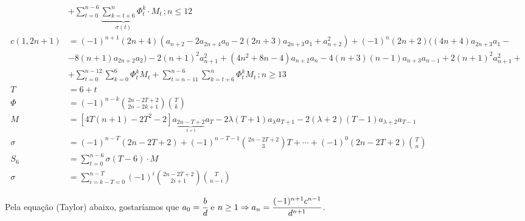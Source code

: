 \documentclass[10pt,a4paper]{article}
\begin{document}
\begin{align*}
    &+ \sum_{t = 0}^{n - 6} \underbrace{\sum_{k = t + 6}^n \Phi_t^k}_{\sigma(t)} \cdot M_t \,; n \le 12 \\
    c(1, 2n + 1) &= (-1)^{n + 1} (2n + 4) (a_{n+2} - 2 a_{2n+4} a_0 - 2 (2n + 3) a_{2n + 3} a_1 + a_{n+2}^2) + (-1)^n (2n + 2) ((4n + 4) a_{2n + 3} a_1 -\\
    &- 8(n+1) a_{2n + 2} a_2) - 2 (n + 1)^2 a_{n + 1}^2  + (4n^2 + 8n - 4) a_{n + 2} a_n - 4 (n + 3)(n - 1) a_{n + 3} a_{n - 1} + 2 (n + 1)^2 a_{n + 1}^2 + \\
    &+ \sum_{t = 0}^{n - 12}  \sum_{k = 0}^6 \Phi_t^k M_t +  \sum_{t = n - 11}^{n - 6}  \sum_{k = t + 6}^n \Phi_t^k M_t \,; n \ge 13 \\
    T &= 6 + t \\
    \Phi &= (-1)^{n - k} \binom{2n - 2T + 2}{2n - 2k + 1} \binom{T}{k} \\
    M &= [4T(n + 1) - 2T^2 - 2] a_{\underbrace{2n - T + 2}_{\lambda + 1}} a_T - 2\lambda (T + 1) a_\lambda a_{T + 1} - 2(\lambda + 2)(T - 1) a_{\lambda + 2} a_{T - 1} \\
    \sigma &= (-1)^{n - T} (2n - 2T + 2) + (-1)^{n - T - 1} \binom{2n - 2T + 2}{3} T + \cdots + (-1)^0 (2n - 2T + 2) \binom{T}{n} \\
    S_6 &= \sum_{t = 0}^{n - 6} \sigma(T - 6) \cdot M \\
    \sigma &= \sum_{i = k - T = 0}^{n - T} (-1)^i \binom{2n - 2T + 2}{2i + 1} \binom{T}{n - i}
  \end{align*}



		Pela equa\c{c}\~ao (Taylor) abaixo, gostar\'iamos que $a_0 = \cfrac{b}{d}$ e $n \ge 1 \Rightarrow a_n = \cfrac{(-1)^{n + 1} c^{n - 1}}{d^{n + 1}}\,$.
\end{document}

